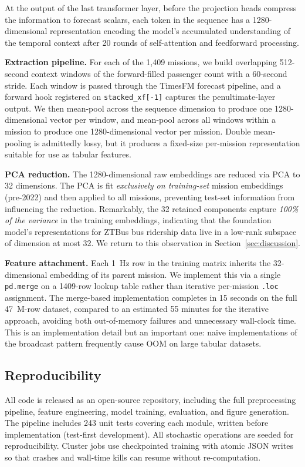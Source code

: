 At the output of the last transformer layer, before the projection heads
compress the information to forecast scalars, each token in the sequence
has a 1280-dimensional representation encoding the model's accumulated
understanding of the temporal context after 20 rounds of self-attention
and feedforward processing.

\textbf{Extraction pipeline.} For each of the 1,409 missions, we build
overlapping 512-second context windows of the forward-filled passenger
count with a 60-second stride. Each window is passed through the TimesFM
forecast pipeline, and a forward hook registered on \texttt{stacked\_xf[-1]}
captures the penultimate-layer output. We then mean-pool across the
sequence dimension to produce one 1280-dimensional vector per window, and
mean-pool across all windows within a mission to produce one
1280-dimensional vector per mission. Double mean-pooling is admittedly lossy,
but it produces a fixed-size per-mission representation suitable for use as
tabular features.

\textbf{PCA reduction.} The 1280-dimensional raw embeddings are reduced
via PCA to 32 dimensions. The PCA is fit \emph{exclusively on training-set}
mission embeddings (pre-2022) and then applied to all missions, preventing
test-set information from influencing the reduction. Remarkably, the 32
retained components capture \emph{100\% of the variance} in the training
embeddings, indicating that the foundation model's representations for
ZTBus bus ridership data live in a low-rank subspace of dimension at most
32. We return to this observation in Section~\ref{sec:discussion}.

\textbf{Feature attachment.} Each 1~Hz row in the training matrix inherits
the 32-dimensional embedding of its parent mission. We implement this via
a single \texttt{pd.merge} on a 1409-row lookup table rather than iterative
per-mission \texttt{.loc} assignment. The merge-based implementation
completes in 15 seconds on the full 47~M-row dataset, compared to an
estimated 55 minutes for the iterative approach, avoiding both
out-of-memory failures and unnecessary wall-clock time. This is an
implementation detail but an important one: naive implementations of the
broadcast pattern frequently cause OOM on large tabular datasets.

\subsection{Reproducibility}

All code is released as an open-source repository, including the full
preprocessing pipeline, feature engineering, model training, evaluation,
and figure generation. The pipeline includes 243 unit tests covering each
module, written before implementation (test-first development). All
stochastic operations are seeded for reproducibility. Cluster jobs use
checkpointed training with atomic JSON writes so that crashes and wall-time
kills can resume without re-computation.
